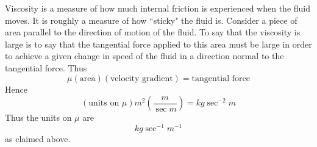 Viscosity is a measure of how much internal friction is experienced when the
fluid moves. It is roughly a measure of how \textquotedblleft sticky" the
fluid is. Consider a piece of area parallel to the direction of motion of
the fluid. To say that the viscosity is large is to say that the tangential
force applied to this area must be large in order to achieve a given change
in speed of the fluid in a direction normal to the tangential force. Thus 
\begin{equation*}
\mu \left( \text{area}\right) \left( \text{velocity gradient}\right) =\text{
tangential force}
\end{equation*}
Hence 
\begin{equation*}
\left( \text{units on }\mu \right) m^{2}\left( \frac{m}{\sec m}\right)
=kg\sec ^{-2}m
\end{equation*}
Thus the units on $\mu $ are 
\begin{equation*}
kg\sec ^{-1}m^{-1}
\end{equation*}
as claimed above.

